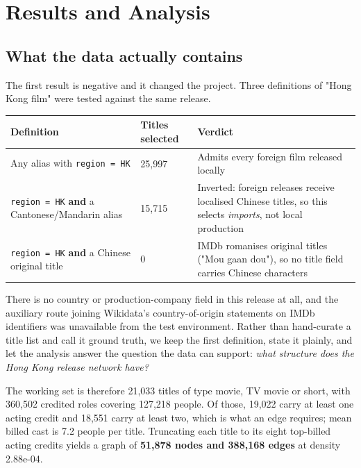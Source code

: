 
\section{Results and Analysis}

\subsection{What the data actually contains}

The first result is negative and it changed the project. Three definitions of "Hong Kong film" were tested against the same release.

\begin{table}[H]
\centering
\footnotesize
\begin{tabularx}{\textwidth}{XXX}
\toprule
Definition & Titles selected & Verdict \\
\midrule
Any alias with \texttt{region = HK} & 25,997 & Admits every foreign film released locally \\
\texttt{region = HK} \textbf{and} a Cantonese/Mandarin alias & 15,715 & Inverted:\allowbreak{} foreign releases receive localised Chinese titles, so this selects \emph{imports}, not local production \\
\texttt{region = HK} \textbf{and} a Chinese original title & 0 & IMDb romanises original titles ("Mou gaan dou"), so no title field carries Chinese characters \\
\bottomrule
\end{tabularx}
\end{table}

There is no country or production-company field in this release at all, and the auxiliary route \textemdash{} joining Wikidata's country-of-origin statements on IMDb identifiers \textemdash{} was unavailable from the test environment. Rather than hand-curate a title list and call it ground truth, we keep the first definition, state it plainly, and let the analysis answer the question the data can support: \emph{what structure does the Hong Kong release network have?}

The working set is therefore 21,033 titles of type movie, TV movie or short, with 360,502 credited roles covering 127,218 people. Of those, 19,022 carry at least one acting credit and 18,551 carry at least two, which is what an edge requires; mean billed cast is 7.2 people per title. Truncating each title to its eight top-billed acting credits yields a graph of \textbf{51,878 nodes and 388,168 edges} at density 2.88e-04.

